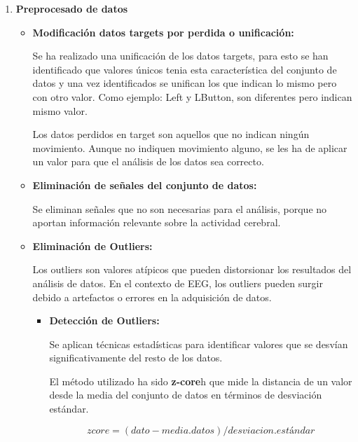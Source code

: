 \begin{enumerate}
\def\labelenumi{\arabic{enumi}.}
\item
\textbf{Preprocesado de datos}


\begin{itemize}

	\item
	\textbf{Modificación datos targets por perdida o unificación:}	
	
	
	Se ha realizado una unificación de los datos targets, para esto se han identificado que valores únicos tenia esta característica del conjunto de datos y una vez identificados se unifican los que indican lo mismo pero con otro valor. Como ejemplo: Left y LButton, son diferentes pero indican mismo valor.



	
	Los datos perdidos en target son aquellos que no indican ningún movimiento. Aunque no indiquen movimiento alguno, se les ha de aplicar un valor para que  el análisis de los datos sea correcto. 
	



	\item
	\textbf{Eliminación de señales del conjunto de datos:}
	
	Se eliminan señales que no son necesarias para el análisis, porque no aportan información relevante sobre la actividad cerebral. 

	
	\item
	\textbf{Eliminación de Outliers:}
	
	Los outliers son valores atípicos que pueden distorsionar los resultados del análisis de datos. En el contexto de EEG, los outliers pueden surgir debido a artefactos o errores en la adquisición de datos.
	\begin{itemize}
	
	\item
	\textbf{Detección de Outliers:}
	
	Se aplican técnicas estadísticas para identificar valores que se desvían significativamente del resto de los datos. 
	
	
	El método utilizado ha sido \textbf{z-core}h que mide la distancia de un valor desde la media del conjunto de datos en términos de desviación estándar.
	
	\begin{equation*}
	zcore = (dato - media.datos) / desviacion.estándar
	\end{equation*}


\end{itemize}
\end{itemize}
\end{enumerate}
